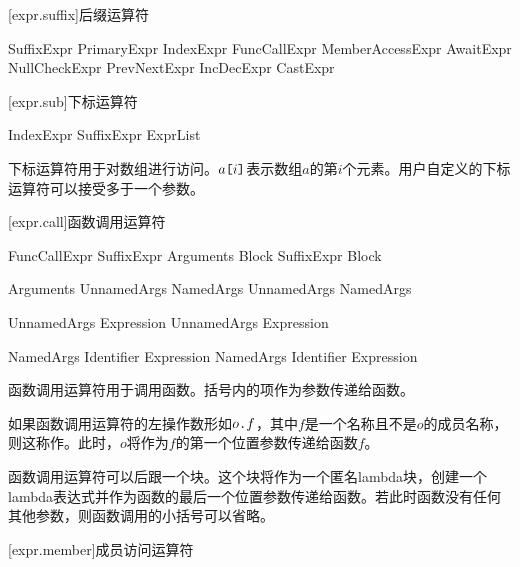 [expr.suffix]{后缀运算符}

\begin{bnf}{SuffixExpr}
    PrimaryExpr \br
    IndexExpr \br
    FuncCallExpr \br
    MemberAccessExpr \br
    AwaitExpr \br
    NullCheckExpr \br
    PrevNextExpr \br
    IncDecExpr \br
    CastExpr
\end{bnf}

[expr.sub]{下标运算符}

\begin{bnf}{IndexExpr}
    SuffixExpr \terminal{[} ExprList\bnfq \terminal{]}
\end{bnf}

\pnum
下标运算符用于对数组进行访问。$a\texttt{[}i\texttt{]}$表示数组$a$的第$i$个元素。用户自定义的下标运算符可以接受多于一个参数。

[expr.call]{函数调用运算符}

\begin{bnf}{FuncCallExpr}
    SuffixExpr \terminal{(} Arguments\bnfq \terminal{)} Block\bnfs \br
    SuffixExpr Block
\end{bnf}

\begin{bnf}{Arguments}
    UnnamedArgs \br
    NamedArgs \br
    UnnamedArgs \terminal{,} NamedArgs
\end{bnf}

\begin{bnf}{UnnamedArgs}
    Expression \br
    UnnamedArgs \terminal{,} Expression
\end{bnf}

\begin{bnf}{NamedArgs}
    Identifier \terminal{:} Expression \br
    NamedArgs \terminal{,} Identifier \terminal{:} Expression
\end{bnf}

\pnum
函数调用运算符用于调用函数。括号内的项作为参数传递给函数。

\pnum
如果函数调用运算符的左操作数形如$o\texttt{.}f$，其中$f$是一个名称且不是$o$的成员名称，则这称作。此时，$o$将作为$f$的第一个位置参数传递给函数$f$。

\pnum
函数调用运算符可以后跟一个块。这个块将作为一个匿名lambda块，创建一个lambda表达式并作为函数的最后一个位置参数传递给函数。若此时函数没有任何其他参数，则函数调用的小括号可以省略。

[expr.member]{成员访问运算符}

